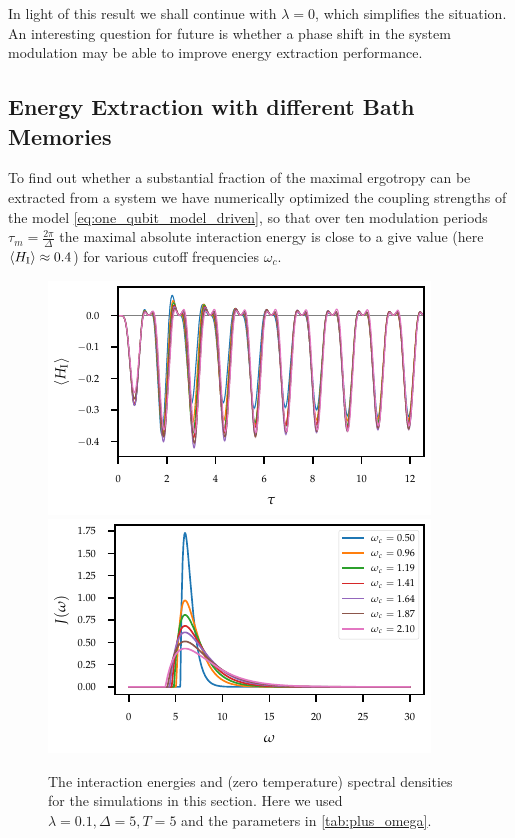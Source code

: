 In light of this result we shall continue with \(λ=0\), which
simplifies the situation. An interesting question for future is
whether a phase shift in the system modulation may be able to improve
energy extraction performance.

\subsection{Energy Extraction with different Bath Memories}
\label{sec:extr_mem}
To find out whether a substantial fraction of the maximal ergotropy
can be extracted from a system we have numerically optimized the
coupling strengths of the model \cref{eq:one_qubit_model_driven}, so
that over ten modulation periods \(τ_{m} = \frac{2 π}{Δ}\) the maximal
absolute interaction energy is close to a give value (here
\(\ev{H_{\inter}}\approx 0.4\)) for various cutoff frequencies
\(ω_{c}\).
\begin{figure}[htp]
  \centering
  \includegraphics{figs/one_bath_mod/omega_interactions}
  \includegraphics{figs/one_bath_mod/omega_sd}
  \caption{\label{fig:omega_couplings_and_energies} The interaction
    energies and (zero temperature) spectral densities for the
    simulations in this section. Here we used \(λ=0.1, Δ=5, T=5\) and
    the parameters in \cref{tab:plus_omega}.}
\end{figure}

